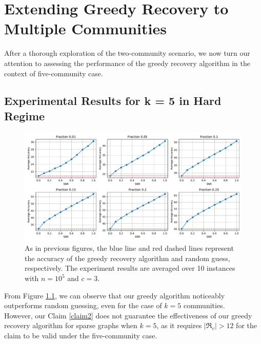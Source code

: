 \chapter{Extending Greedy Recovery to Multiple Communities} \label{chapter 5}
After a thorough exploration of the two-community scenario, we now turn our attention to assessing the performance of the greedy recovery algorithm in the context of five-community case.
\section{Experimental Results for k = 5 in Hard Regime}
\begin{figure}[ht]
    \centering
    \includegraphics[width=1\linewidth]{Figures/multi_groups_sparse(modified)_1.pdf}
    \caption[Accuracy of Greedy Recovery Algorithm in Sparse Graph with $k=5$]{As in previous figures, the blue line and red dashed lines represent the accuracy of the greedy recovery algorithm and random guess, respectively. The experiment results are averaged over 10 instances with $n=10^5$ and $c=3.$}
    \label{fig: multi_groups}
\end{figure}
From Figure \ref{fig: multi_groups}, we can observe that our greedy algorithm noticeably outperforms random guessing, even for the case of $k=5$ communities.\\
However, our Claim \ref{claim2} does not guarantee the effectiveness of our greedy recovery algorithm for sparse graphs when $k=5$, as it requires $|\Re_v| > 12$ for the claim to be valid under the five-community case.